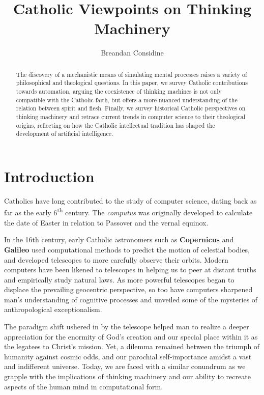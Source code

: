 \documentclass[sigplan,nonacm]{acmart}\settopmatter{printfolios=false,printccs=false,printacmref=false}
\begin{document}
  \title{Catholic Viewpoints on Thinking Machinery}
  \begin{abstract}
  The discovery of a mechanistic means of simulating mental processes raises a variety of philosophical and theological questions. In this paper, we survey Catholic contributions towards automation, arguing the coexistence of thinking machines is not only compatible with the Catholic faith, but offers a more nuanced understanding of the relation between spirit and flesh. Finally, we survey historical Catholic perspectives on thinking machinery and retrace current trends in computer science to their theological origins, reflecting on how the Catholic intellectual tradition has shaped the development of artificial intelligence.
  \end{abstract}

  \author{Breandan Considine}

  \maketitle

  \section{Introduction}

  Catholics have long contributed to the study of computer science, dating back as far as the early 6\textsuperscript{th} century. The \textit{computus} was originally developed to calculate the date of Easter in relation to Passover and the vernal equinox.

  In the 16th century, early Catholic astronomers such as \textbf{Copernicus} and \textbf{Galileo} used computational methods to predict the motion of celestial bodies, and developed telescopes to more carefully observe their orbits. Modern computers have been likened to telescopes in helping us to peer at distant truths and empirically study natural laws. As more powerful telescopes began to displace the prevailing geocentric perspective, so too have computers sharpened man's understanding of cognitive processes and unveiled some of the mysteries of anthropological exceptionalism.

  The paradigm shift ushered in by the telescope helped man to realize a deeper appreciation for the enormity of God's creation and our special place within it as the legatees to Christ's mission. Yet, a dilemma remained between the triumph of humanity against cosmic odds, and our parochial self-importance amidst a vast and indifferent universe. Today, we are faced with a similar conundrum as we grapple with the implications of thinking machinery and our ability to recreate aspects of the human mind in computational form.
\end{document}
